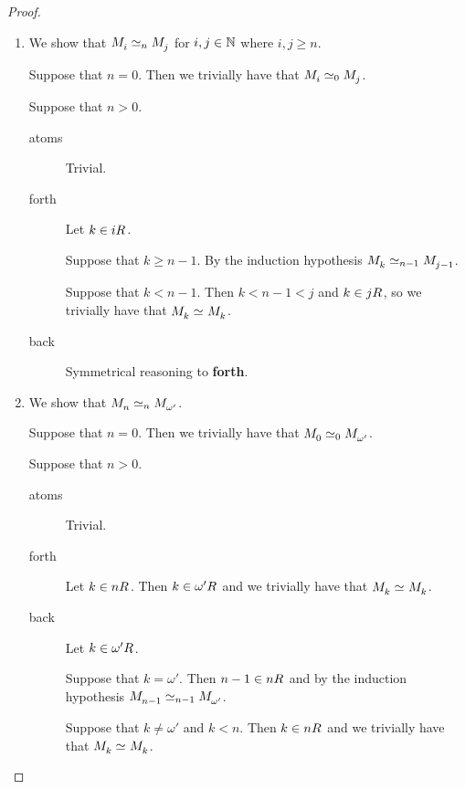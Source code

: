 \begin{proof}
\begin{enumerate}
    \item We show that $\kPModel{i} \bisimilar[n] \kPModel{j}$ for $i, j \in \mathbb{N}$ where $i, j \geq n$.

        Suppose that $n = 0$. Then we trivially have that $\kPModel{i} \bisimilar[0] \kPModel{j}$.

        Suppose that $n > 0$.
        \begin{description}
            \item[atoms] Trivial.

            \item[forth] Let $k \in \kSuccessors{}{i}$.

            Suppose that $k \geq n - 1$. By the induction hypothesis $\kPModel{k} \bisimilar [n-1] \kPModel{j - 1}$.

            Suppose that $k < n - 1$. Then $k < n - 1 < j$ and $k \in \kSuccessors{}{j}$, so we trivially have that $\kPModel{k} \bisimilar \kPModel{k}$.

            \item[back] Symmetrical reasoning to {\bf forth}.
        \end{description}

    \item We show that $\kPModel{n} \bisimilar[n] \kPModel{\omega'}$.

        Suppose that $n = 0$. Then we trivially have that $\kPModel{0} \bisimilar[0] \kPModel{\omega'}$.

        Suppose that $n > 0$.

        \begin{description}
            \item[atoms] Trivial.

            \item[forth] Let $k \in \kSuccessors{}{n}$. Then $k \in \kSuccessors{}{\omega'}$ and we trivially have that $\kPModel{k} \bisimilar \kPModel{k}$.

            \item[back] Let $k \in \kSuccessors{}{\omega'}$. 

                Suppose that $k = \omega'$. Then $n - 1 \in \kSuccessors{}{n}$ and by the induction hypothesis $\kPModel{n - 1} \bisimilar[n - 1] \kPModel{\omega'}$. 

                Suppose that $k \neq \omega'$ and $k < n$. Then $k \in \kSuccessors{}{n}$ and we trivially have that $\kPModel{k} \bisimilar \kPModel{k}$.


\end{description}
\end{enumerate}
\end{proof}
